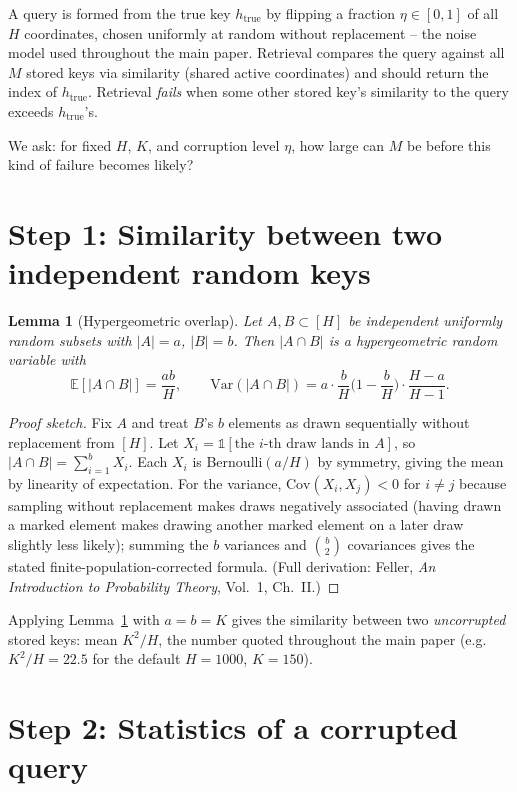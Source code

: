 \documentclass[11pt]{article}
\newtheorem{lemma}{Lemma}
\begin{document}
A query is formed from the true key $h_{\text{true}}$ by flipping a fraction $\eta \in [0,1]$
of all $H$ coordinates, chosen uniformly at random without replacement -- the noise model used
throughout the main paper. Retrieval compares the query against all $M$ stored keys via
similarity (shared active coordinates) and should return the index of $h_{\text{true}}$.
Retrieval \emph{fails} when some other stored key's similarity to the query exceeds
$h_{\text{true}}$'s.

We ask: for fixed $H$, $K$, and corruption level $\eta$, how large can $M$ be before this kind
of failure becomes likely?

\section{Step 1: Similarity between two independent random keys}
\label{sec:step1}

\begin{lemma}[Hypergeometric overlap]
\label{lem:hypergeom}
Let $A, B \subset [H]$ be independent uniformly random subsets with $|A| = a$, $|B| = b$. Then
$|A \cap B|$ is a hypergeometric random variable with
\[
\mathbb{E}[|A \cap B|] = \frac{ab}{H}, \qquad
\mathrm{Var}(|A \cap B|) = a\cdot\frac{b}{H}\Big(1-\frac{b}{H}\Big)\cdot\frac{H-a}{H-1}.
\]
\end{lemma}

\begin{proof}[Proof sketch]
Fix $A$ and treat $B$'s $b$ elements as drawn sequentially without replacement from $[H]$.
Let $X_i = \mathbb{1}[\text{the $i$-th draw lands in } A]$, so $|A\cap B| = \sum_{i=1}^b X_i$.
Each $X_i$ is Bernoulli$(a/H)$ by symmetry, giving the mean by linearity of expectation. For
the variance, $\mathrm{Cov}(X_i,X_j) < 0$ for $i\ne j$ because sampling without replacement
makes draws negatively associated (having drawn a marked element makes drawing another
marked element on a later draw slightly less likely); summing the $b$ variances and
$\binom{b}{2}$ covariances gives the stated finite-population-corrected formula. (Full
derivation: Feller, \textit{An Introduction to Probability Theory}, Vol.\ 1, Ch.\ II.)
\end{proof}

Applying Lemma~\ref{lem:hypergeom} with $a=b=K$ gives the similarity between two
\emph{uncorrupted} stored keys: mean $K^2/H$, the number quoted throughout the main paper (e.g.\
$K^2/H = 22.5$ for the default $H=1000$, $K=150$).

\section{Step 2: Statistics of a corrupted query}
\label{sec:step2}
\end{document}

